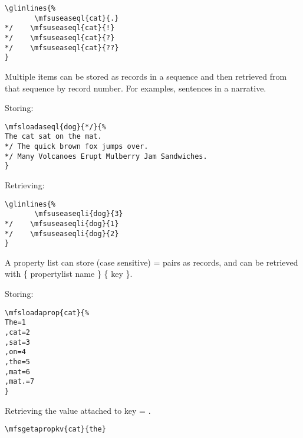 \documentclass{article}
\begin{document}
\begin{verbatim}
\glinlines{%
       \mfsuseaseql{cat}{.}
*/    \mfsuseaseql{cat}{!}
*/    \mfsuseaseql{cat}{?}
*/    \mfsuseaseql{cat}{??}
}
\end{verbatim}


 Multiple items can be stored as records in a sequence and then retrieved from that sequence by record number. For examples, sentences in a narrative.



\begin{exe}
\ex  
{}
\end{exe}

Storing:

\begin{verbatim}
\mfsloadaseql{dog}{*/}{%
The cat sat on the mat.
*/ The quick brown fox jumps over.
*/ Many Volcanoes Erupt Mulberry Jam Sandwiches.
}
\end{verbatim}

Retrieving:

\begin{verbatim}
\glinlines{%
       \mfsuseaseqli{dog}{3}
*/    \mfsuseaseqli{dog}{1}
*/    \mfsuseaseqli{dog}{2}
}
\end{verbatim}


 A property list can store (case sensitive)  =  pairs as records, and can be retrieved with  \{ propertylist name \} \{ key \}.





Storing:

\begin{verbatim}
\mfsloadaprop{cat}{%
The=1
,cat=2
,sat=3
,on=4
,the=5
,mat=6
,mat.=7
}
\end{verbatim}

Retrieving the value attached to key  = .

\begin{verbatim}
\mfsgetapropkv{cat}{the}
\end{verbatim}
\end{document}

